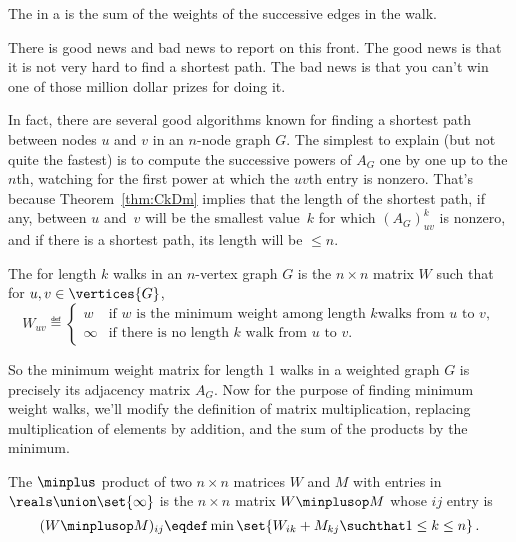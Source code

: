 \begin{editingnotes}
\begin{definition}\label{def:5H}
  The   in a  is the sum of the weights of
  the successive edges in the walk.
\end{definition}

There is good news and bad news to report on this front.  The good
news is that it is not very hard to find a shortest path.  The bad
news is that you can't win one of those million dollar prizes for
doing it.

In fact, there are several good algorithms known for finding a shortest
path between nodes $u$ and $v$ in an $n$-node graph $G$.  The simplest to
explain (but not quite the fastest) is to compute  the successive powers of $A_G$ one by one up
to the $n$th, watching for the first power at which the $uv$th entry is
nonzero.  That's because Theorem~\ref{thm:CkDm} implies that the length of
the shortest path, if any, between $u$ and~$v$ will be the smallest
value~$k$ for which $(A_G)_{uv}^k$ is nonzero, and if there is a shortest
path, its length will be $\leq n$.

\begin{definition}
  The  for length $k$ walks in an $n$-vertex
  graph $G$ is the $n \times n$ matrix $W$ such that for $u,v \in \vertices{G}$,
\begin{equation}\label{def:weight_matrix}
W_{uv} \eqdef
\begin{cases} w & \text{if $w$ is the minimum weight among length $k$
                            walks from $u$ to $v$},\\
              \infty & \text{if there is no length $k$ walk from $u$ to $v$}.
\end{cases}
\end{equation}
\end{definition}

So the minimum weight matrix for length $1$ walks in a weighted graph $G$
is precisely its adjacency matrix $A_G$.  Now for the purpose of finding
minimum weight walks, we'll modify the definition of matrix
multiplication, replacing multiplication of elements by addition, and the
sum of the products by the minimum.

\begin{definition}\label{def:minplus}
  The $\minplus$ product of two $n\times n$ matrices $W$ and $M$ with
  entries in $\reals\union \set{\infty}$ is the $n \times n$ matrix
  $W\minplusop M$ whose $ij$ entry is
\[
(W\minplusop M )_{ij} \eqdef \min \set{W_{ik} + M_{kj} \suchthat 1 \leq k \leq n}\, .
\]
\end{definition}


\end{editingnotes}
